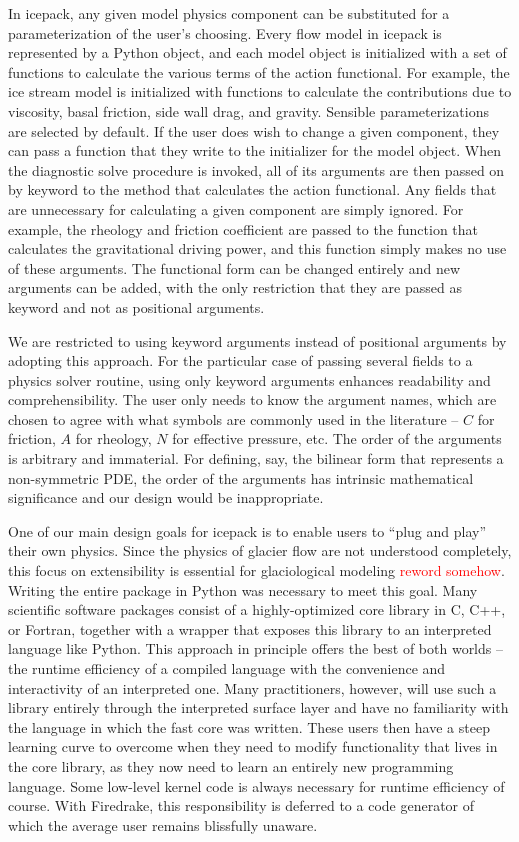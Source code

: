 \documentclass{article}
\theoremstyle{definition}
\theoremstyle{plain}
\begin{document}
In icepack, any given model physics component can be substituted for a parameterization of the user's choosing.
Every flow model in icepack is represented by a Python object, and each model object is initialized with a set of functions to calculate the various terms of the action functional.
For example, the ice stream model is initialized with functions to calculate the contributions due to viscosity, basal friction, side wall drag, and gravity.
Sensible parameterizations are selected by default.
If the user does wish to change a given component, they can pass a function that they write to the initializer for the model object.
When the diagnostic solve procedure is invoked, all of its arguments are then passed on by keyword to the method that calculates the action functional.
Any fields that are unnecessary for calculating a given component are simply ignored.
For example, the rheology and friction coefficient are passed to the function that calculates the gravitational driving power, and this function simply makes no use of these arguments.
The functional form can be changed entirely and new arguments can be added, with the only restriction that they are passed as keyword and not as positional arguments.

We are restricted to using keyword arguments instead of positional arguments by adopting this approach.
For the particular case of passing several fields to a physics solver routine, using only keyword arguments enhances readability and comprehensibility.
The user only needs to know the argument names, which are chosen to agree with what symbols are commonly used in the literature -- $C$ for friction, $A$ for rheology, $N$ for effective pressure, etc.
The order of the arguments is arbitrary and immaterial.
For defining, say, the bilinear form that represents a non-symmetric PDE, the order of the arguments has intrinsic mathematical significance and our design would be inappropriate.

One of our main design goals for icepack is to enable users to ``plug and play'' their own physics.
Since the physics of glacier flow are not understood completely, this focus on extensibility is essential for glaciological modeling \textcolor{red}{reword somehow}.
Writing the entire package in Python was necessary to meet this goal.
Many scientific software packages consist of a highly-optimized core library in C, C++, or Fortran, together with a wrapper that exposes this library to an interpreted language like Python.
This approach in principle offers the best of both worlds -- the runtime efficiency of a compiled language with the convenience and interactivity of an interpreted one.
Many practitioners, however, will use such a library entirely through the interpreted surface layer and have no familiarity with the language in which the fast core was written.
These users then have a steep learning curve to overcome when they need to modify functionality that lives in the core library, as they now need to learn an entirely new programming language.
Some low-level kernel code is always necessary for runtime efficiency of course.
With Firedrake, this responsibility is deferred to a code generator of which the average user remains blissfully unaware.
\end{document}
